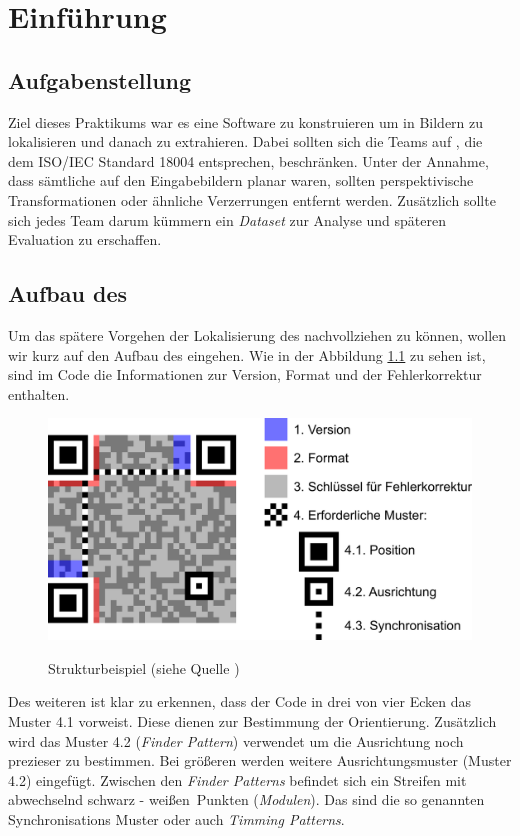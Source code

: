 \chapter{Einführung}
\section{Aufgabenstellung}
Ziel dieses Praktikums war es eine Software zu konstruieren um \QRCodes in Bildern zu lokalisieren und danach zu extrahieren.
Dabei sollten sich die Teams auf \QRCodes, die dem ISO/IEC Standard 18004 entsprechen, beschränken.
Unter der Annahme, dass sämtliche \QRCodes auf den Eingabebildern planar waren, sollten perspektivische Transformationen oder ähnliche Verzerrungen entfernt werden.
Zusätzlich sollte sich jedes Team darum kümmern ein \emph{Dataset} zur Analyse und späteren Evaluation zu erschaffen.
 
\section{Aufbau des \QRCodes}
Um das spätere Vorgehen der Lokalisierung des \QRCodes nachvollziehen zu können, wollen wir kurz auf den Aufbau des \QRCodes eingehen.
Wie in der Abbildung \ref{fig:struktur-qrcode} zu sehen ist, sind im Code die Informationen zur Version, Format und der Fehlerkorrektur enthalten. 

\begin{figure}[h]
\centering
\includegraphics[scale=0.3]{images/QR_Code_Struktur_Beispiel.png}
\label{fig:struktur-qrcode}\caption{\QRCode Strukturbeispiel (siehe Quelle \cite{qrcoderef})}
\end{figure}


Des weiteren ist klar zu erkennen, dass der Code in drei von vier Ecken das Muster 4.1 vorweist. Diese dienen zur Bestimmung der Orientierung. Zusätzlich wird das Muster 4.2 (\emph{Finder Pattern}) verwendet um die Ausrichtung noch prezieser zu bestimmen. Bei größeren \QRCodes werden weitere Ausrichtungsmuster (Muster 4.2) eingefügt. Zwischen den \emph{Finder Patterns} befindet sich ein Streifen mit abwechselnd \glqq schwarz - weißen\grqq\  Punkten (\emph{Modulen}). Das sind die so genannten Synchronisations Muster oder auch \emph{Timming Patterns}.

